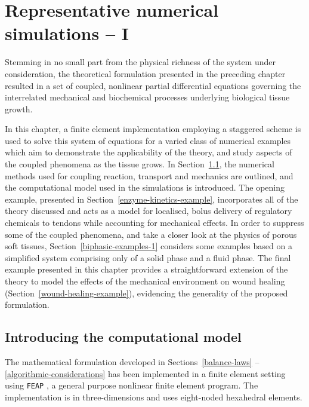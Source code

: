 \chapter{Representative numerical simulations -- I}
\label{numerical-simulations-1}

Stemming in no small part from the physical richness of the system
under consideration, the theoretical formulation presented in the
preceding chapter resulted in a set of coupled, nonlinear partial
differential equations governing the interrelated mechanical and
biochemical processes underlying biological tissue growth.

In this chapter, a finite element implementation employing a staggered
scheme is used to solve this system of equations for a varied class of
numerical examples which aim to demonstrate the applicability of the
theory, and study aspects of the coupled phenomena as the tissue
grows. In Section~\ref{computational-model}, the numerical methods
used for coupling reaction, transport and mechanics are outlined, and
the computational model used in the simulations is introduced. The
opening example, presented in Section~\ref{enzyme-kinetics-example},
incorporates all of the theory discussed and acts as a model for
localised, bolus delivery of regulatory chemicals to tendons while
accounting for mechanical effects. In order to suppress some of the
coupled phenomena, and take a closer look at the physics of porous
soft tissues, Section~\ref{biphasic-examples-1} considers some
examples based on a simplified system comprising only of a solid phase
and a fluid phase. The final example presented in this chapter
provides a straightforward extension of the theory to model the
effects of the mechanical environment on wound healing
(Section~\ref{wound-healing-example}), evidencing the generality of
the proposed formulation.

\section{Introducing the computational model}
\label{computational-model}

The mathematical formulation developed in Sections~\ref{balance-laws}%
--\ref{algorithmic-considerations} has been implemented in a finite
element setting using {\tt FEAP} \citep{FEAPmanual}, a general purpose
nonlinear finite element program. The implementation is in
three-dimensions and uses eight-noded hexahedral elements.

